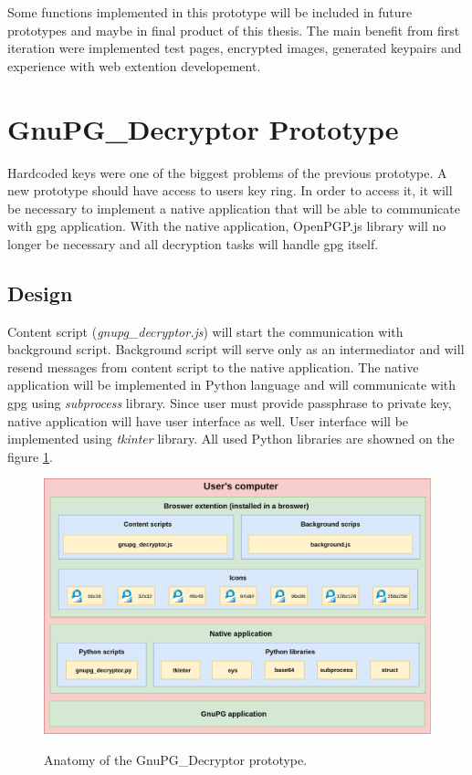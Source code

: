 Some functions implemented in this prototype will be included in future prototypes and maybe in final product of this thesis. The main benefit from first iteration were implemented test pages, encrypted images, generated keypairs and experience with web extention developement.

\section{GnuPG\_Decryptor Prototype}
\label{prototype:GnuPG_Decryptor}
Hardcoded keys were one of the biggest problems of the previous prototype. A new prototype should have access to users key ring. In order to access it, it will be necessary to implement a native application that will be able to communicate with gpg application. With the native application, OpenPGP.js library will no longer be necessary and all decryption tasks will handle gpg itself.

\subsection{Design}
Content script (\textit{gnupg\_decryptor.js}) will start the communication with background script. Background script will serve only as an intermediator and will resend messages from content script to the native application. The native application will be implemented in Python language and will communicate with gpg using \textit{subprocess} library. Since user must provide passphrase to private key, native application will have user interface as well. User interface will be implemented using \textit{tkinter} library. All used Python libraries are showned on the figure \ref{img:gnupg_decryptorAnatomy}.

\begin{figure}[H]
    \begin{center}
        \label{img:gnupg_decryptorAnatomy}
        \includegraphics[width=1.0\textwidth]{obrazky-figures/prototype-GnuPG_Decryptor.png}
        \caption{Anatomy of the GnuPG\_Decryptor prototype.}
    \end{center}
\end{figure}

